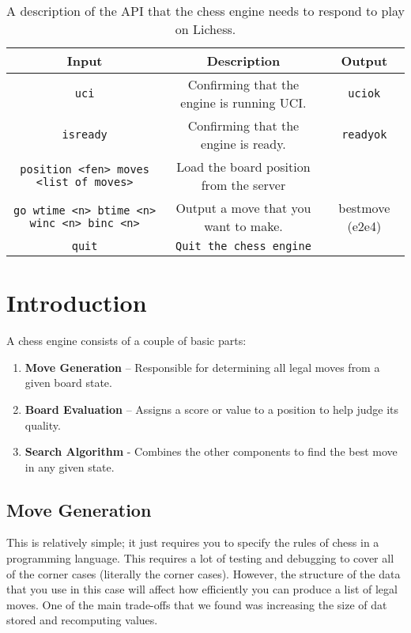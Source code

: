 \documentclass[sigconf]{acmart}
\begin{document}
\begin{table*}[h]
    \centering
    \renewcommand{\arraystretch}{1.2}
    \setlength{\tabcolsep}{8pt}
    \begin{tabular}{|c|c|c|}
        \hline
        \textbf{Input} & \textbf{Description} & \textbf{Output} \\
        \hline
        \texttt{uci} & Confirming that the engine is running UCI. & \texttt{uciok} \\
        \hline
        \texttt{isready} & Confirming that the engine is ready. & \texttt{readyok} \\
        \hline
        \texttt{position <fen> moves <list of moves>} & Load the board position from the server & \\
        \hline
        \texttt{go wtime <n> btime <n> winc <n> binc <n>} & Output a move that you want to make. & bestmove (e2e4) \\
        \hline
        \texttt{quit} & \texttt{Quit the chess engine} & \\
        \hline
    \end{tabular}
    \caption{A description of the API that the chess engine needs to respond to play on Lichess.}
    \label{tab:api}
\end{table*}


\section{Introduction}
A chess engine consists of a couple of basic parts:
\begin{enumerate}
    \item \textbf{Move Generation} – Responsible for determining all legal moves from a given board state.
    \item \textbf{Board Evaluation} – Assigns a score or value to a position to help judge its quality.
    \item \textbf{Search Algorithm} - Combines the other components to find the best move in any given state.
\end{enumerate}

\subsection{Move Generation}
This is relatively simple; it just requires you to specify the rules of chess in a programming language.
This requires a lot of testing and debugging to cover all of the corner cases (literally the corner cases).
However, the structure of the data that you use in this case will affect how efficiently you can produce a list of legal moves.
One of the main trade-offs that we found was increasing the size of dat stored and recomputing values.
\end{document}
